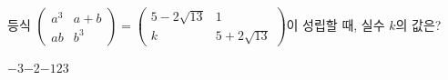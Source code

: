등식 $\begin{pmatrix} a^3 & a+b \\ ab & b^3 \end{pmatrix}=\begin{pmatrix} 5-2\sqrt{13} & 1 \\ k & 5+2\sqrt{13} \end{pmatrix}$이 성립할 때, 실수 $k$의 값은? 
\begin{choices32}{$-3$}{$-2$}{$-1$}{$2$}{$3$}\end{choices32}
